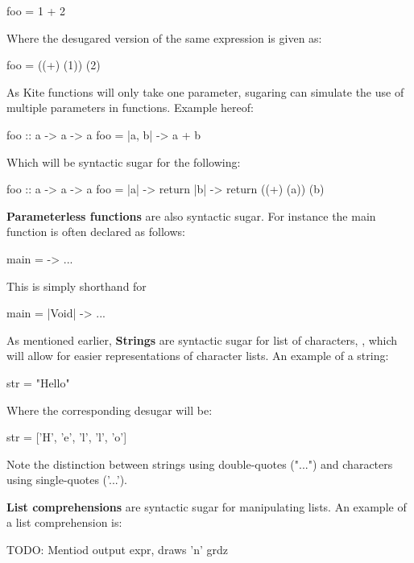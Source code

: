 \begin{kite}
foo = 1 + 2
\end{kite}

Where the desugared version of the same expression is given as:

\begin{kite}
foo = ((+) (1)) (2)
\end{kite}

As Kite functions will only take one parameter, sugaring can simulate the use of multiple parameters in functions. Example hereof:

\begin{kite}
foo :: a -> a -> a
foo = |a, b| -> {
  a + b
}
\end{kite}

Which will be syntactic sugar for the following:

\begin{kite}
foo :: a -> a -> a
foo = |a| -> {
  return |b| -> {
    return ((+) (a)) (b)
  }
}
\end{kite}

\textbf{Parameterless functions} are also syntactic sugar. For instance the main function is often declared as follows:

\begin{kite}
main = -> {
  ...
}
\end{kite}

This is simply shorthand for

\begin{kite}
main = |Void| -> {
  ...
}
\end{kite}

As mentioned earlier, \textbf{Strings} are syntactic sugar for list of characters, \code{[Char]}, which will allow for easier representations of character lists. An example of a string:

\begin{kite}
str = "Hello"
\end{kite}

Where the corresponding desugar will be:
\begin{kite}
str = ['H', 'e', 'l', 'l', 'o']
\end{kite}
Note the distinction between strings using double-quotes ("...") and characters using single-quotes ('...').

\label{sec:ex-listcomp}
\textbf{List comprehensions} are syntactic sugar for manipulating lists. An example of a list comprehension is:

TODO: Mentiod output expr, draws 'n' grdz

